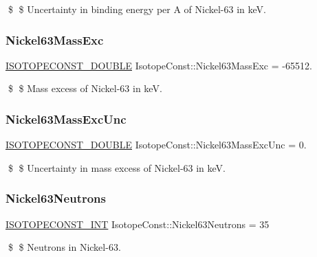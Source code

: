 \$ \$ Uncertainty in binding energy per A of Nickel-\/63 in keV. \mbox{\label{group___isotope_const-_nickel-_ni63_gafe7d9155c1324854494c017568b54560}} 
\subsubsection{\texorpdfstring{Nickel63\+Mass\+Exc}{Nickel63MassExc}}
{\footnotesize\ttfamily \mbox{\hyperlink{group___isotope_const-_macros_ga8f45a7272ce02c0b4c65c44636ed719a}{I\+S\+O\+T\+O\+P\+E\+C\+O\+N\+S\+T\+\_\+\+D\+O\+U\+B\+LE}} Isotope\+Const\+::\+Nickel63\+Mass\+Exc = -\/65512.}

\$ \$ Mass excess of Nickel-\/63 in keV. \mbox{\label{group___isotope_const-_nickel-_ni63_ga119953a81363ed10f445c609b69e5c4e}} 
\subsubsection{\texorpdfstring{Nickel63\+Mass\+Exc\+Unc}{Nickel63MassExcUnc}}
{\footnotesize\ttfamily \mbox{\hyperlink{group___isotope_const-_macros_ga8f45a7272ce02c0b4c65c44636ed719a}{I\+S\+O\+T\+O\+P\+E\+C\+O\+N\+S\+T\+\_\+\+D\+O\+U\+B\+LE}} Isotope\+Const\+::\+Nickel63\+Mass\+Exc\+Unc = 0.}

\$ \$ Uncertainty in mass excess of Nickel-\/63 in keV. \mbox{\label{group___isotope_const-_nickel-_ni63_ga67b646bb2aefea1d64b6129e22d10185}} 
\subsubsection{\texorpdfstring{Nickel63\+Neutrons}{Nickel63Neutrons}}
{\footnotesize\ttfamily \mbox{\hyperlink{group___isotope_const-_macros_ga5f18360b3e99483a35c32d789e62621c}{I\+S\+O\+T\+O\+P\+E\+C\+O\+N\+S\+T\+\_\+\+I\+NT}} Isotope\+Const\+::\+Nickel63\+Neutrons = 35}

\$ \$ Neutrons in Nickel-\/63. \mbox{\label{group___isotope_const-_nickel-_ni63_gab1f59554c6ed550cc1470be1d473f396}} 
